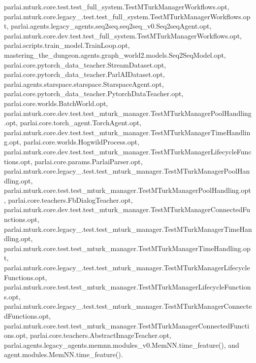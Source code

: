 parlai.\+mturk.\+core.\+test.\+test\+\_\+full\+\_\+system.\+Test\+M\+Turk\+Manager\+Workflows.\+opt, parlai.\+mturk.\+core.\+legacy\+\_.\+test.\+test\+\_\+full\+\_\+system.\+Test\+M\+Turk\+Manager\+Workflows.\+opt, parlai.\+agents.\+legacy\+\_\+agents.\+seq2seq.\+seq2seq\+\_\+v0.\+Seq2seq\+Agent.\+opt, parlai.\+mturk.\+core.\+dev.\+test.\+test\+\_\+full\+\_\+system.\+Test\+M\+Turk\+Manager\+Workflows.\+opt, parlai.\+scripts.\+train\+\_\+model.\+Train\+Loop.\+opt, mastering\+\_\+the\+\_\+dungeon.\+agents.\+graph\+\_\+world2.\+models.\+Seq2\+Seq\+Model.\+opt, parlai.\+core.\+pytorch\+\_\+data\+\_\+teacher.\+Stream\+Dataset.\+opt, parlai.\+core.\+pytorch\+\_\+data\+\_\+teacher.\+Parl\+A\+I\+Dataset.\+opt, parlai.\+agents.\+starspace.\+starspace.\+Starspace\+Agent.\+opt, parlai.\+core.\+pytorch\+\_\+data\+\_\+teacher.\+Pytorch\+Data\+Teacher.\+opt, parlai.\+core.\+worlds.\+Batch\+World.\+opt, parlai.\+mturk.\+core.\+dev.\+test.\+test\+\_\+mturk\+\_\+manager.\+Test\+M\+Turk\+Manager\+Pool\+Handling.\+opt, parlai.\+core.\+torch\+\_\+agent.\+Torch\+Agent.\+opt, parlai.\+mturk.\+core.\+dev.\+test.\+test\+\_\+mturk\+\_\+manager.\+Test\+M\+Turk\+Manager\+Time\+Handling.\+opt, parlai.\+core.\+worlds.\+Hogwild\+Process.\+opt, parlai.\+mturk.\+core.\+dev.\+test.\+test\+\_\+mturk\+\_\+manager.\+Test\+M\+Turk\+Manager\+Lifecycle\+Functions.\+opt, parlai.\+core.\+params.\+Parlai\+Parser.\+opt, parlai.\+mturk.\+core.\+legacy\+\_.\+test.\+test\+\_\+mturk\+\_\+manager.\+Test\+M\+Turk\+Manager\+Pool\+Handling.\+opt, parlai.\+mturk.\+core.\+test.\+test\+\_\+mturk\+\_\+manager.\+Test\+M\+Turk\+Manager\+Pool\+Handling.\+opt, parlai.\+core.\+teachers.\+Fb\+Dialog\+Teacher.\+opt, parlai.\+mturk.\+core.\+dev.\+test.\+test\+\_\+mturk\+\_\+manager.\+Test\+M\+Turk\+Manager\+Connected\+Functions.\+opt, parlai.\+mturk.\+core.\+legacy\+\_.\+test.\+test\+\_\+mturk\+\_\+manager.\+Test\+M\+Turk\+Manager\+Time\+Handling.\+opt, parlai.\+mturk.\+core.\+test.\+test\+\_\+mturk\+\_\+manager.\+Test\+M\+Turk\+Manager\+Time\+Handling.\+opt, parlai.\+mturk.\+core.\+legacy\+\_.\+test.\+test\+\_\+mturk\+\_\+manager.\+Test\+M\+Turk\+Manager\+Lifecycle\+Functions.\+opt, parlai.\+mturk.\+core.\+test.\+test\+\_\+mturk\+\_\+manager.\+Test\+M\+Turk\+Manager\+Lifecycle\+Functions.\+opt, parlai.\+mturk.\+core.\+legacy\+\_.\+test.\+test\+\_\+mturk\+\_\+manager.\+Test\+M\+Turk\+Manager\+Connected\+Functions.\+opt, parlai.\+mturk.\+core.\+test.\+test\+\_\+mturk\+\_\+manager.\+Test\+M\+Turk\+Manager\+Connected\+Functions.\+opt, parlai.\+core.\+teachers.\+Abstract\+Image\+Teacher.\+opt, parlai.\+agents.\+legacy\+\_\+agents.\+memnn.\+modules\+\_\+v0.\+Mem\+N\+N.\+time\+\_\+feature(), and agent.\+modules.\+Mem\+N\+N.\+time\+\_\+feature().



